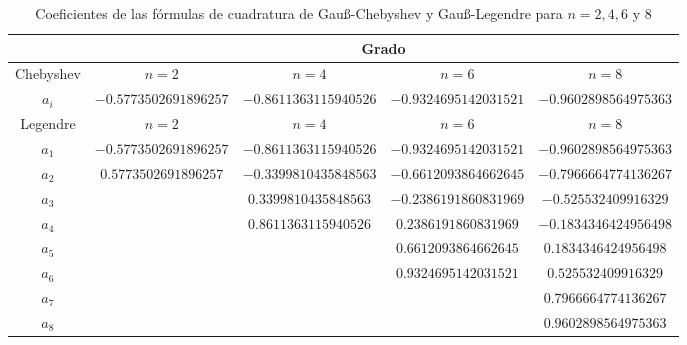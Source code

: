 \documentclass[a4paper]{article}
\begin{document}
\begin{table}[ht]
    \centering
    \begin{tabular}{|c|c|c|c|c|}
        \cline{2-5}
        \multicolumn{1}{c}{} & \multicolumn{4}{|c|}{Grado}\\
        \hline
        Chebyshev & $n=2$ & $n=4$ & $n=6$ & $n=8$ \\
        \hline
        $a_i$ & $-0.5773502691896257$ & $-0.8611363115940526$ & $-0.9324695142031521$ & $-0.9602898564975363$ \\
        \hline
        \hline
        Legendre & $n=2$ & $n=4$ & $n=6$ & $n=8$ \\
        \hline
        $a_1$ & $-0.5773502691896257$ & $-0.8611363115940526$ & $-0.9324695142031521$ & $-0.9602898564975363$ \\
        $a_2$ & $0.5773502691896257$ & $-0.3399810435848563$ & $-0.6612093864662645$ & $-0.7966664774136267$ \\
        $a_3$ & & $0.3399810435848563$ & $-0.2386191860831969$ & $-0.525532409916329$ \\
        $a_4$ & & $0.8611363115940526$ & $0.2386191860831969$ & $-0.1834346424956498$ \\
        $a_5$ & & & $0.6612093864662645$ & $0.1834346424956498$ \\
        $a_6$ & & & $0.9324695142031521$ & $0.525532409916329$ \\
        $a_7$ & & & & $0.7966664774136267$ \\
        $a_8$ & & & & $0.9602898564975363$ \\
        \hline
    \end{tabular}
    \caption{Coeficientes de las fórmulas de cuadratura de Gau\ss-Chebyshev y Gau\ss-Legendre para $n=2,4,6\text{ y }8$}
\end{table}
\end{document}
